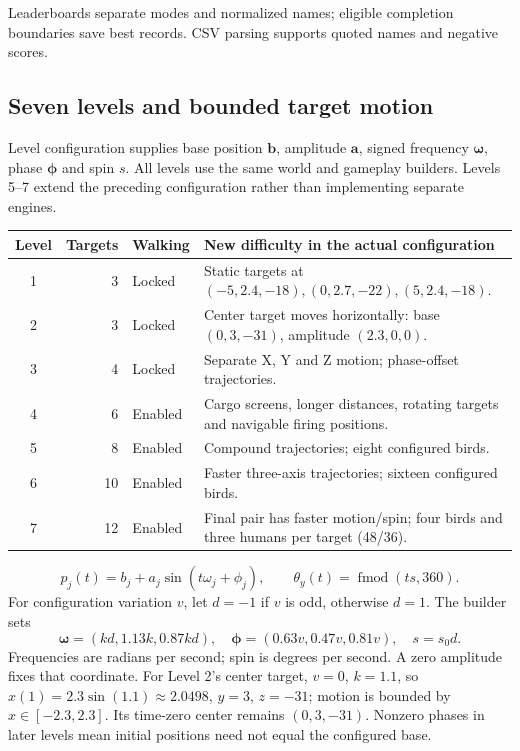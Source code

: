 Leaderboards separate modes and normalized names; eligible completion boundaries save best records. CSV parsing supports quoted names and negative scores.\subsection{Seven levels and bounded target motion}
Level configuration supplies base position $\mathbf b$, amplitude $\mathbf a$, signed frequency $\boldsymbol\omega$, phase $\boldsymbol\phi$ and spin $s$. All levels use the same world and gameplay builders. Levels 5--7 extend the preceding configuration rather than implementing separate engines.
\begin{center}\begin{tabularx}{\linewidth}{crlX}\toprule
Level & Targets & Walking & New difficulty in the actual configuration \\\midrule
1 &3&Locked&Static targets at $(-5,2.4,-18),(0,2.7,-22),(5,2.4,-18)$.\\
2 &3&Locked&Center target moves horizontally: base $(0,3,-31)$, amplitude $(2.3,0,0)$.\\
3 &4&Locked&Separate X, Y and Z motion; phase-offset trajectories.\\
4 &6&Enabled&Cargo screens, longer distances, rotating targets and navigable firing positions.\\
5 &8&Enabled&Compound trajectories; eight configured birds.\\
6 &10&Enabled&Faster three-axis trajectories; sixteen configured birds.\\
7 &12&Enabled&Final pair has faster motion/spin; four birds and three humans per target (48/36).\\\bottomrule
\end{tabularx}\end{center}
\begin{equation}
 p_j(t)=b_j+a_j\sin(t\omega_j+\phi_j),\qquad \theta_y(t)=\operatorname{fmod}(ts,360).
\end{equation}
For configuration variation $v$, let $d=-1$ if $v$ is odd, otherwise $d=1$. The builder sets
\[
 \boldsymbol\omega=(kd,1.13k,0.87kd),\quad
 \boldsymbol\phi=(0.63v,0.47v,0.81v),\quad s=s_0d.
\]
Frequencies are radians per second; spin is degrees per second. A zero amplitude fixes that coordinate. For Level 2's center target, $v=0$, $k=1.1$, so $x(1)=2.3\sin(1.1)\approx2.0498$, $y=3$, $z=-31$; motion is bounded by $x\in[-2.3,2.3]$. Its time-zero center remains $(0,3,-31)$. Nonzero phases in later levels mean initial positions need not equal the configured base.

